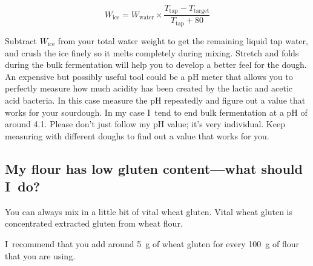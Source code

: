 \[
W_{\mathrm{ice}} = W_{\mathrm{water}} \times \frac{T_{\mathrm{tap}} - T_{\mathrm{target}}}{T_{\mathrm{tap}} + 80}
\]

Subtract $W_{\mathrm{ice}}$ from your total water weight to get the remaining
liquid tap water, and crush the ice finely so it melts completely during mixing.
Stretch and folds during the bulk fermentation
will help you to develop a better feel for
the dough. An expensive but possibly useful tool
could be a pH meter that allows you to perfectly
measure how much acidity has been created by the
lactic and acetic acid bacteria. In this case measure
the pH repeatedly and figure out a value that works
for your sourdough. In my case I~tend to end bulk
fermentation at a pH of around 4.1. Please don't just
follow my pH value; it's very individual. Keep measuring
with different doughs to find out a value that works for you.

\subsection{My flour has low gluten content---what should I~do?}

You can always mix in a little bit of vital wheat gluten. Vital wheat gluten
is concentrated extracted gluten from wheat flour.

I~recommend that you add around \qty{5}{\gram} of wheat gluten for every
\qty{100}{\gram} of flour that you are using.
